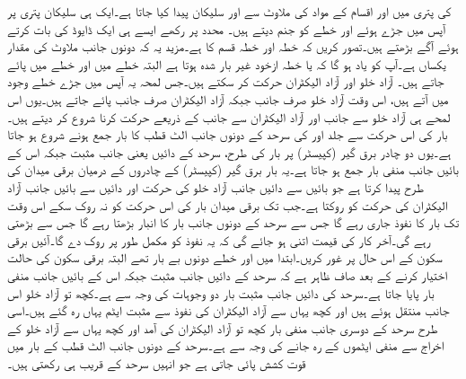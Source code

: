  کی پتری میں  اور  اقسام کے مواد کی ملاوٹ سے  اور  سلیکان پیدا کیا جاتا ہے۔ایک ہی سلیکان پتری پر آپس میں جڑے ہوئے  اور  خطے  کو جنم دیتے ہیں۔ محدد پر رکھے ایسے ہی ایک ڈایوڈ کی بات کرتے ہوئے آگے بڑھتے ہیں۔تصور کریں کہ  خطہ  اور  خطہ  قسم کا ہے۔مزید یہ کہ دونوں جانب ملاوٹ کی مقدار یکساں ہے۔آپ کو یاد ہو گا کہ  یا  خطہ ازخود غیر بار شدہ ہوتا ہے البتہ  خطے میں  اور  خطے میں  پائے جاتے ہیں۔ آزاد خلو اور آزاد الیکٹران حرکت کر سکتے ہیں۔جس لمحہ یہ آپس میں جڑے خطے وجود میں آتے ہیں، اس وقت آزاد خلو صرف  جانب جبکہ آزاد الیکٹران صرف  جانب پائے جاتے ہیں۔یوں اس لمحے ہی  آزاد خلو  سے  جانب اور آزاد الیکٹران  سے  جانب   کے ذریعے حرکت کرنا شروع کر دیتے ہیں۔بار کی اس حرکت سے جلد  اور  کی سرحد کے دونوں جانب الٹ قطب کا بار جمع ہونے شروع ہو جاتا ہے۔یوں دو چادر برق گیر (کپیسٹر)  پر بار کی طرح، سرحد کے دائیں یعنی  جانب مثبت جبکہ اس کے بائیں جانب منفی بار جمع ہو جاتا ہے۔یہ بار برق گیر (کپیسٹر)  کے چادروں کے درمیان برقی میدان کی طرح  پیدا کرتا ہے جو بائیں سے دائیں جانب آزاد خلو کی حرکت اور دائیں سے بائیں جانب آزاد الیکٹران کی حرکت  کو روکتا ہے۔جب تک برقی میدان  بار کی اس حرکت کو نہ روک سکے اس وقت تک بار کا نفوذ جاری رہے گا جس سے سرحد کے دونوں جانب بار کا انبار بڑھتا رہے گا جس سے  بڑھتی رہے گی۔آخر کار   کی قیمت اتنی ہو جائے گی کہ یہ نفوذ کو مکمل طور پر روک دے گا۔آئیں برقی سکون کے اس حال پر غور کریں۔ابتدا میں  اور  خطے دونوں بے بار تھے البتہ برقی سکون کی حالت اختیار کرنے کے بعد صاف ظاہر ہے کہ سرحد کے دائیں جانب مثبت جبکہ اس کے بائیں جانب منفی بار پایا جاتا ہے۔سرحد کی  دائیں جانب مثبت بار دو وجوہات کی وجہ سے ہے۔کچھ تو آزاد خلو اس جانب منتقل ہوئے ہیں اور کچھ یہاں سے آزاد الیکٹران کی نفوذ سے مثبت ایٹم یہاں رہ گئے ہیں۔اسی طرح سرحد کے دوسری جانب منفی بار کچھ تو آزاد الیکٹران کی آمد اور کچھ یہاں سے آزاد خلو کے اخراج سے  منفی ایٹموں کے رہ جانے کی وجہ سے ہے۔سرحد کے دونوں جانب الٹ قطب کے بار میں قوت کشش پائی جاتی ہے جو انہیں سرحد کے قریب ہی رکھتی ہیں۔

